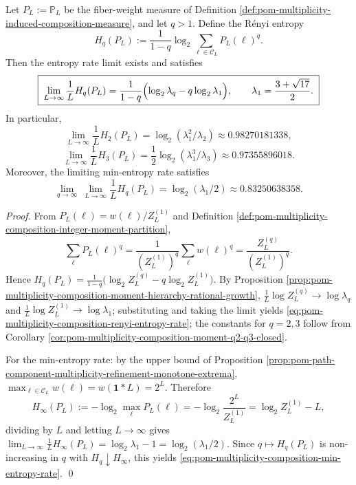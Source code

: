 \begin{proposition}\label{prop:pom-multiplicity-composition-renyi-entropy-rate}
Let \(P_L:=\mathbb{P}_L\) be the fiber-weight measure of Definition \ref{def:pom-multiplicity-induced-composition-measure}, and let \(q>1\).
Define the R\'enyi entropy
\[
H_q(P_L):=\frac{1}{1-q}\log_2\sum_{\boldsymbol{\ell}\in\mathcal{C}_L}P_L(\boldsymbol{\ell})^{q}.
\]
Then the entropy rate limit exists and satisfies
\begin{equation}\label{eq:pom-multiplicity-composition-renyi-entropy-rate}
\boxed{\;
\lim_{L\to\infty}\frac{1}{L}H_q(P_L)
=\frac{1}{1-q}\Bigl(\log_2\lambda_q-q\log_2\lambda_1\Bigr),\qquad
\lambda_1=\frac{3+\sqrt{17}}{2}.\;}
\end{equation}
In particular,
\[
\boxed{\;
\lim_{L\to\infty}\frac{1}{L}H_2(P_L)=\log_2(\lambda_1^2/\lambda_2)\approx 0.98270181338,\;}
\]
\[
\boxed{\;
\lim_{L\to\infty}\frac{1}{L}H_3(P_L)=\frac12\log_2(\lambda_1^3/\lambda_3)\approx 0.97355896018.\;}
\]
Moreover, the limiting min-entropy rate satisfies
\begin{equation}\label{eq:pom-multiplicity-composition-min-entropy-rate}
\boxed{\;
\lim_{q\to\infty}\ \lim_{L\to\infty}\frac{1}{L}H_q(P_L)
=\log_2(\lambda_1/2)\approx 0.83250638358.\;}
\end{equation}
\end{proposition}
\begin{proof}
From \(P_L(\boldsymbol{\ell})=w(\boldsymbol{\ell})/Z_L^{(1)}\) and Definition \ref{def:pom-multiplicity-composition-integer-moment-partition},
\[
\sum_{\boldsymbol{\ell}}P_L(\boldsymbol{\ell})^q
=\frac{1}{(Z_L^{(1)})^q}\sum_{\boldsymbol{\ell}}w(\boldsymbol{\ell})^q
=\frac{Z_L^{(q)}}{(Z_L^{(1)})^q}.
\]
Hence
\(
H_q(P_L)=\frac{1}{1-q}\bigl(\log_2 Z_L^{(q)}-q\log_2 Z_L^{(1)}\bigr)
\).
By Proposition \ref{prop:pom-multiplicity-composition-moment-hierarchy-rational-growth},
\(
\frac{1}{L}\log Z_L^{(q)}\to \log\lambda_q
\)
and
\(
\frac{1}{L}\log Z_L^{(1)}\to \log\lambda_1
\);
substituting and taking the limit yields \eqref{eq:pom-multiplicity-composition-renyi-entropy-rate}; the constants for \(q=2,3\) follow from Corollary \ref{cor:pom-multiplicity-composition-moment-q2-q3-closed}.
\par
For the min-entropy rate: by the upper bound of Proposition \ref{prop:pom-path-component-multiplicity-refinement-monotone-extrema},
\(
\max_{\boldsymbol{\ell}\in\mathcal{C}_L}w(\boldsymbol{\ell})=w(\boldsymbol{1}*L)=2^L
\).
Therefore
\[
H_\infty(P_L):=-\log_2\max_{\boldsymbol{\ell}}P_L(\boldsymbol{\ell})
=-\log_2\frac{2^L}{Z_L^{(1)}}=\log_2 Z_L^{(1)}-L,
\]
dividing by \(L\) and letting \(L\to\infty\) gives
\(
\lim_{L\to\infty}\frac{1}{L}H_\infty(P_L)=\log_2\lambda_1-1=\log_2(\lambda_1/2)
\).
Since \(q\mapsto H_q(P_L)\) is non-increasing in \(q\) with \(H_q\downarrow H_\infty\), this yields \eqref{eq:pom-multiplicity-composition-min-entropy-rate}. \qed
\end{proof}

